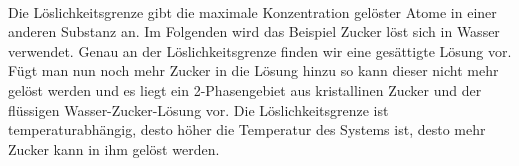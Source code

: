 \documentclass[11pt,a4paper]{article}
\numberwithin{equation}{section}
\numberwithin{figure}{section}
\begin{document}
\\
\begin{addmargin}[25pt]{0pt}
Die Löslichkeitsgrenze gibt die maximale Konzentration gelöster Atome in einer anderen Substanz an. Im Folgenden wird das Beispiel Zucker löst sich in Wasser verwendet. Genau an der Löslichkeitsgrenze finden wir eine gesättigte Lösung vor. Fügt man nun noch mehr Zucker in die Lösung hinzu so kann dieser nicht mehr gelöst werden und es liegt ein 2-Phasengebiet aus kristallinen Zucker und der flüssigen Wasser-Zucker-Lösung vor. Die Löslichkeitsgrenze ist temperaturabhängig, desto höher die Temperatur des Systems ist, desto mehr Zucker kann in ihm gelöst werden.  \\
\end{addmargin}
\end{document}
